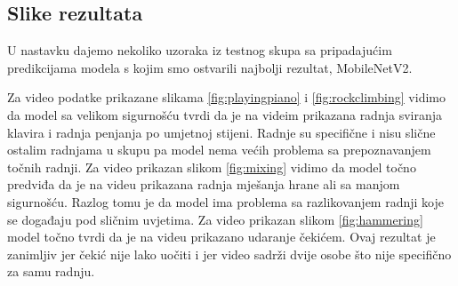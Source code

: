 \documentclass[times, utf8, diplomski,  numeric]{fer}
\begin{document}
\subsection{Slike rezultata}
U nastavku dajemo nekoliko uzoraka iz testnog skupa sa pripadajućim predikcijama modela s kojim smo ostvarili najbolji rezultat, MobileNetV2.
\par
Za video podatke prikazane slikama \ref{fig:playingpiano} i \ref{fig:rockclimbing} vidimo da model sa velikom sigurnošću tvrdi da je na videim prikazana radnja sviranja klavira i radnja penjanja po umjetnoj stijeni. Radnje su specifične i nisu slične ostalim radnjama u skupu pa model nema većih problema sa prepoznavanjem točnih radnji. Za video prikazan slikom \ref{fig:mixing} vidimo da model točno predviđa da je na videu prikazana radnja mješanja hrane ali sa manjom sigurnošću. Razlog tomu je da model ima problema sa razlikovanjem radnji koje se događaju pod sličnim uvjetima. Za video prikazan slikom \ref{fig:hammering} model točno tvrdi da je na videu prikazano udaranje čekićem. Ovaj rezultat je zanimljiv jer čekić nije lako uočiti i jer video sadrži dvije osobe što nije specifično za samu radnju.
\end{document}
